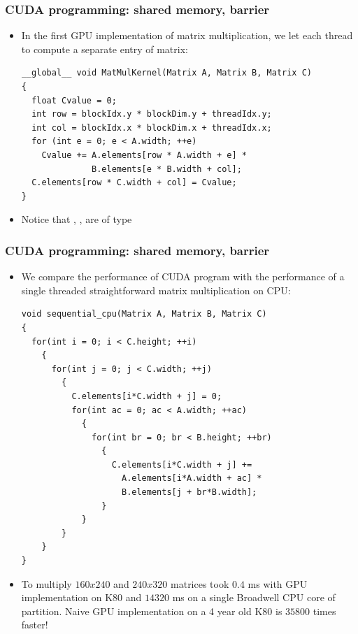 \begin{frame}[fragile]
  \frametitle{CUDA programming: shared memory, barrier}
\begin{itemize}
\item In the first GPU implementation of matrix multiplication, we let each thread to 
  compute a separate entry of  matrix:
{\color{mycolorcode}
\begin{verbatim}
__global__ void MatMulKernel(Matrix A, Matrix B, Matrix C)
{
  float Cvalue = 0;
  int row = blockIdx.y * blockDim.y + threadIdx.y;
  int col = blockIdx.x * blockDim.x + threadIdx.x;
  for (int e = 0; e < A.width; ++e)
    Cvalue += A.elements[row * A.width + e] * 
              B.elements[e * B.width + col];
  C.elements[row * C.width + col] = Cvalue;
}
\end{verbatim}
}
\item Notice that , ,  are of type 
\end{itemize}
\end{frame}

\begin{frame}[fragile]
  \frametitle{CUDA programming: shared memory, barrier}
\begin{itemize}
\item We compare the performance of CUDA program with the performance of a single threaded straightforward matrix multiplication on CPU:
{\tiny
{\color{mycolorcode}
\begin{verbatim}
void sequential_cpu(Matrix A, Matrix B, Matrix C)
{
  for(int i = 0; i < C.height; ++i)
    {
      for(int j = 0; j < C.width; ++j)
        {
          C.elements[i*C.width + j] = 0;
          for(int ac = 0; ac < A.width; ++ac)
            {
              for(int br = 0; br < B.height; ++br)
                {
                  C.elements[i*C.width + j] += 
                    A.elements[i*A.width + ac] * 
                    B.elements[j + br*B.width];
                }
            }
        }
    }
}
\end{verbatim}
}
}
\item To multiply $160x240$ and $240x320$ matrices took $0.4$ ms with GPU implementation on K80 and $14320$ ms on a single Broadwell CPU core of  partition. 
  Naive GPU implementation on a 4 year old K80 is $35800$ times faster!
\end{itemize}
\end{frame}

